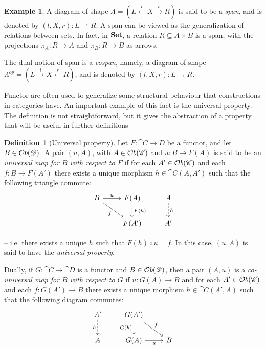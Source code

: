 \documentclass[a4paper, twoside,openright]{report}
\theoremstyle{plain}
\theoremstyle{definition}
\newtheorem{definition}[theorem]{Definition}
\newtheorem{example}[theorem]{Example}
\begin{document}
\begin{example}\label{ex: span}
    A diagram of shape $\Lambda = (L \xleftarrow{l} X \xrightarrow{r} R)$ is said to be a \emph{span}, and is denoted by $(l, X, r): L \rightharpoonup R$.
    A span can be viewed as the generalization of relations between sets. In fact, in $\mathbf{Set}$, a relation $R \subseteq A \times B$ is a span, with the projections $\pi_A : R \rightarrow A$ and $\pi_B : R \rightarrow B$ as arrows.
    
    The dual notion of span is a \emph{cospan}, namely, a diagram of shape $\Lambda^{op} = (L \xrightarrow{l} X \xleftarrow{r} R)$, and is denoted by $(l, X, r): L \rightharpoondown R$.
\end{example}

Functor are often used to generalize some structural behaviour that constructions in categories have. An important example of this fact is the universal property. The definition is not straightforward, but it gives the abstraction of a property that will be useful in further definitions%

\begin{definition}[Universal property]\label{def:univ_prop}
    Let $F: \cat{C \rightarrow D}$ be a functor, and let $B \in \mathcal{O}b(\mathscr{D})$. A pair $(u, A)$, with $A \in \mathcal{O}b(\mathscr{C})$ and $u: B \rightarrow F(A)$ is said to be an \emph{universal map for $B$ with respect to $F$} if for each $A' \in \mathcal{O}b(\mathscr{C})$ and each $f: B \rightarrow F(A')$ there exists a unique morphism $h \in \cat C(A, A')$ such that the following triangle commute:
    \[
        \begin{tikzcd}
            B \arrow[r, "u"] \arrow[dr, "f" swap] & F(A) \arrow[d, dashed, "F(h)"] & A \arrow[d, dashed, "h"]\\
            & F(A') & A'
        \end{tikzcd}
    \]

    -- i.e. there exists a unique $h$ such that $F(h) \circ u = f$. In this case, $(u, A)$ is said to have the \emph{universal property}.

    Dually, if $G: \cat C \rightarrow \cat D$ is a functor and $B \in \mathcal{O}b(\mathscr{D})$, then a pair $(A, u)$ is a \emph{co-universal map for $B$ with respect to $G$} if $u:G(A) \rightarrow B$ and for each $A' \in \mathcal{O}b(\mathscr{C})$ and each $f: G(A') \rightarrow B$ there exists a unique morphism $h \in \cat{C}(A', A)$ such that the following diagram commutes:
    \[
        \begin{tikzcd}
            A' \arrow[d, dashed, "h" swap] & G(A') \arrow[d, dashed, "G(h)" swap] \arrow[dr, "f"] \\
            A & G(A) \arrow[r, "u" swap] & B
        \end{tikzcd}
    \]
\end{definition}
\end{document}
